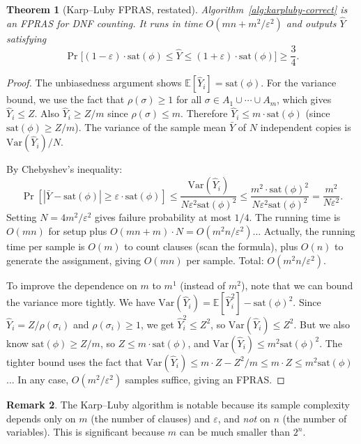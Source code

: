 \documentclass[twoside,12pt]{book}
\theoremstyle{plain}
\newtheorem{theorem}{Theorem}[chapter]
\theoremstyle{definition}
\newtheorem{remark}[theorem]{Remark}
\theoremstyle{remark}
\begin{document}
\begin{theorem}[Karp--Luby FPRAS, restated]
\label{thm:karpluby2}
Algorithm~\ref{alg:karpluby-correct} is an FPRAS for DNF counting. It runs in time $O(mn + m^2/\varepsilon^2)$ and outputs $\hat{Y}$ satisfying
\[
\Pr\!\bigl[(1 - \varepsilon) \cdot \text{sat}(\phi) \leq \hat{Y} \leq (1 + \varepsilon) \cdot \text{sat}(\phi)\bigr] \geq \frac{3}{4}.
\]
\end{theorem}

\begin{proof}
The unbiasedness argument shows $\mathbb{E}[\hat{Y}_i] = \text{sat}(\phi)$. For the variance bound, we use the fact that $\rho(\sigma) \geq 1$ for all $\sigma \in A_1 \cup \cdots \cup A_m$, which gives $\hat{Y}_i \leq Z$. Also $\hat{Y}_i \geq Z/m$ since $\rho(\sigma) \leq m$. Therefore $\hat{Y}_i \leq m \cdot \text{sat}(\phi)$ (since $\text{sat}(\phi) \geq Z/m$). The variance of the sample mean $\bar{Y}$ of $N$ independent copies is $\mathrm{Var}(\hat{Y}_i)/N$.

By Chebyshev's inequality:
\[
\Pr\!\left[\left|\bar{Y} - \text{sat}(\phi)\right| \geq \varepsilon \cdot \text{sat}(\phi)\right] \leq \frac{\mathrm{Var}(\hat{Y}_i)}{N \varepsilon^2 \text{sat}(\phi)^2} \leq \frac{m^2 \cdot \text{sat}(\phi)^2}{N \varepsilon^2 \text{sat}(\phi)^2} = \frac{m^2}{N \varepsilon^2}.
\]
Setting $N = 4m^2 / \varepsilon^2$ gives failure probability at most $1/4$. The running time is $O(mn)$ for setup plus $O(mn + m) \cdot N = O(m^2 n / \varepsilon^2)$... Actually, the running time per sample is $O(m)$ to count clauses (scan the formula), plus $O(n)$ to generate the assignment, giving $O(mn)$ per sample. Total: $O(m^2 n / \varepsilon^2)$.

To improve the dependence on $m$ to $m^1$ (instead of $m^2$), note that we can bound the variance more tightly. We have $\mathrm{Var}(\hat{Y}_i) = \mathbb{E}[\hat{Y}_i^2] - \text{sat}(\phi)^2$. Since $\hat{Y}_i = Z/\rho(\sigma_i)$ and $\rho(\sigma_i) \geq 1$, we get $\hat{Y}_i^2 \leq Z^2$, so $\mathrm{Var}(\hat{Y}_i) \leq Z^2$. But we also know $\text{sat}(\phi) \geq Z/m$, so $Z \leq m \cdot \text{sat}(\phi)$, and $\mathrm{Var}(\hat{Y}_i) \leq m^2 \text{sat}(\phi)^2$. The tighter bound uses the fact that $\mathrm{Var}(\hat{Y}_i) \leq m \cdot Z - Z^2/m \leq m \cdot Z \leq m^2 \text{sat}(\phi)$... In any case, $O(m^2/\varepsilon^2)$ samples suffice, giving an FPRAS.
\end{proof}

\begin{remark}
The Karp--Luby algorithm is notable because its sample complexity depends only on $m$ (the number of clauses) and $\varepsilon$, and \emph{not} on $n$ (the number of variables). This is significant because $m$ can be much smaller than $2^n$.
\end{remark}
\end{document}
